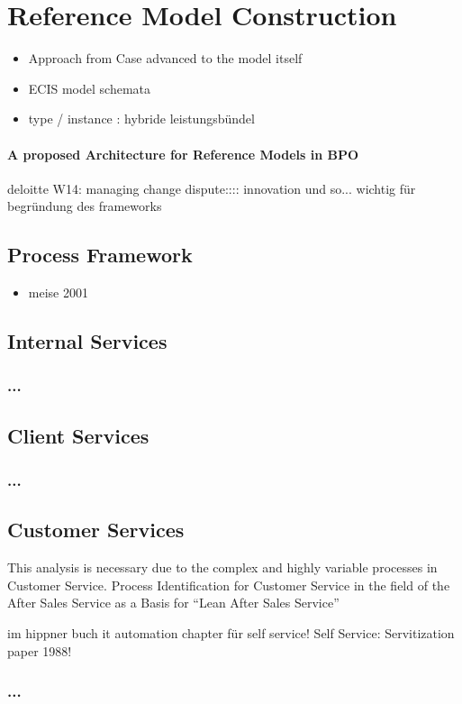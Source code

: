 
\chapter{Reference Model Construction}
\begin{itemize}
	\item Approach from Case advanced to the model itself
	\item ECIS model schemata
	\item type / instance : hybride leistungsbündel
\end{itemize}
\subsubsection{A proposed Architecture for Reference Models in BPO}
	deloitte W14: managing change dispute:::: innovation und so... wichtig für begründung des frameworks
	\section{Process Framework}
	\begin{itemize}
		\item meise 2001
	\end{itemize}
	\section{Internal Services}
	\subsection{...}
	\section{Client Services}
	\subsection{...}
	\section{Customer Services}
	This analysis is necessary due to the complex and highly variable processes in Customer Service. Process Identification for Customer Service in the field of the After Sales Service as a Basis for “Lean After Sales Service”
	
	im hippner buch it automation chapter für self service!
	Self Service: Servitization paper 1988!
	\subsection{...}
